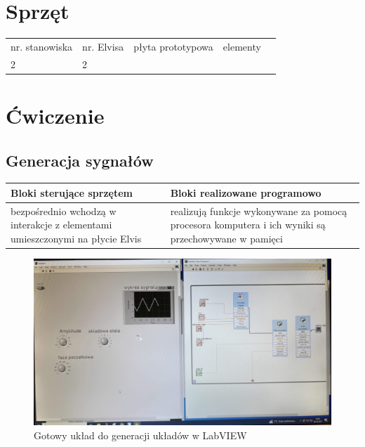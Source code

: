 \documentclass[11pt]{article}
\begin{document}
\section{Sprzęt}
\begin{table}[H]
\centering
\begin{tabular}{lllll}
\cline{1-4}
\multicolumn{1}{|l|}{nr. stanowiska} & \multicolumn{1}{l|}{nr. Elvisa} & \multicolumn{1}{l|}{płyta prototypowa} & \multicolumn{1}{l|}{elementy} &  \\ \cline{1-4}
\multicolumn{1}{|l|}{2}               & \multicolumn{1}{l|}{2}           & \multicolumn{1}{l|}{}                  & \multicolumn{1}{l|}{}         &  \\ \cline{1-4}
\end{tabular}
\end{table}

\section{Ćwiczenie}
\subsection{Generacja sygnałów}

\begin{table}[H]
\centering
\begin{tabular}{|p{5cm}|p{5cm}|}
\hline
Bloki sterujące sprzętem & Bloki realizowane programowo \\ \hline
bezpośrednio wchodzą w interakcje z elementami umieszczonymi na płycie Elvis &  realizują funkcje wykonywane za pomocą procesora komputera i ich wyniki są przechowywane w pamięci \\ \hline
\end{tabular}
\end{table}


\begin{figure}[H]
    \centering
    \includegraphics[width=0.5\linewidth]{img/obraz1.jpg}
    \caption{Gotowy układ do generacji układów w LabVIEW}
    \label{fig:placeholder}
\end{figure}
\end{document}
